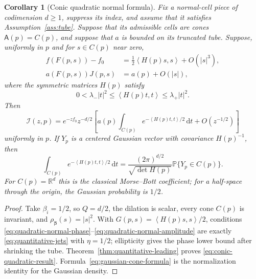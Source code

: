 \documentclass[11pt]{amsart}
\numberwithin{equation}{section}
\newtheorem{corollary}[theorem]{Corollary}
\theoremstyle{definition}
\theoremstyle{remark}
\newcommand{\R}{\mathbb{R}}
\newcommand{\dd}{\,\mathrm{d}}
\newcommand{\cI}{\mathcal{I}}
\newcommand{\Afib}{\mathsf{A}}
\newcommand{\inner}[2]{\left\langle #1,#2\right\rangle}
\begin{document}
\begin{corollary}[Conic quadratic normal formula]\label{cor:conic-quadratic}
Fix a normal-cell piece of codimension $d\ge1$, suppress its index, and
assume that it satisfies Assumption~\ref{ass:tube}.  Suppose that its
admissible cells are cones
$\Afib(p)=C(p)$, and suppose that $a$ is bounded on its truncated tube.
Suppose, uniformly in $p$ and for $s\in C(p)$ near zero,
\begin{align}
 f(F(p,s))-f_0
 &=\frac12\inner{H(p)s}{s}+O(|s|^3),\label{eq:quadratic-normal-phase}\\
 a(F(p,s))J(p,s)&=a(p)+O(|s|),\label{eq:quadratic-normal-amplitude}
\end{align}
where the symmetric matrices $H(p)$ satisfy
\begin{equation}\label{eq:quadratic-normal-ellipticity}
 0<\lambda_-|t|^2\le\inner{H(p)t}{t}\le\lambda_+|t|^2.
\end{equation}
Then
\begin{equation}\label{eq:conic-quadratic-result}
 \cI(z,p)=e^{-zf_0}z^{-d/2}
 \left[
 a(p)\int_{C(p)}e^{-\inner{H(p)t}{t}/2}\dd t
 +O(z^{-1/2})
 \right]
\end{equation}
uniformly in $p$.  If $Y_p$ is a centered Gaussian vector with covariance
$H(p)^{-1}$, then
\begin{equation}\label{eq:gaussian-cone-formula}
 \int_{C(p)}e^{-\inner{H(p)t}{t}/2}\dd t
 =\frac{(2\pi)^{d/2}}{\sqrt{\det H(p)}}
  \mathbb P\{Y_p\in C(p)\}.
\end{equation}
For $C(p)=\R^d$ this is the classical Morse--Bott coefficient; for a half-space
through the origin, the Gaussian probability is $1/2$.
\end{corollary}

\begin{proof}
Take $\beta_i=1/2$, so $Q=d/2$, the dilation is scalar, every cone $C(p)$ is
invariant, and $\rho_{\bm\beta}(s)=|s|^2$.  With
$G(p,s)=\inner{H(p)s}{s}/2$, conditions
\eqref{eq:quadratic-normal-phase}--\eqref{eq:quadratic-normal-amplitude} are exactly
\eqref{eq:quantitative-jets} with $\eta=1/2$; ellipticity gives the phase lower
bound after shrinking the tube.  Theorem~\ref{thm:quantitative-leading} proves
\eqref{eq:conic-quadratic-result}.  Formula~\eqref{eq:gaussian-cone-formula}
is the normalization identity for the Gaussian density.
\end{proof}
\end{document}
